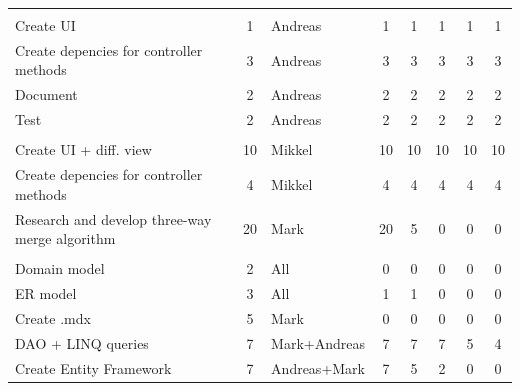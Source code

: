 \documentclass[a4paper,11pt,report]{report}
\begin{document}
\begin{landscape}
\begin{table}[htbp]
\begin{tabular}{l c l c c c c c}
				&       &       &       &       &       &       &  \\
				Create UI & 1     & Andreas & 1     & 1     & 1     & 1     & 1 \\
				Create depencies for controller methods & 3     & Andreas & 3     & 3     & 3     & 3     & 3 \\
				Document & 2     & Andreas & 2     & 2     & 2     & 2     & 2 \\
				Test  & 2     & Andreas & 2     & 2     & 2     & 2     & 2 \\
				&       &       &       &       &       &       &  \\
				Create UI + diff. view & 10    & Mikkel & 10    & 10    & 10    & 10    & 10 \\
				Create depencies for controller methods & 4     & Mikkel & 4     & 4     & 4     & 4     & 4 \\
				Research and develop three-way merge algorithm & 20    & Mark  & 20    & 5     & 0     & 0     & 0 \\
				&       &       &       &       &       &       &  \\
				Domain model & 2     & All   & 0     & 0     & 0     & 0     & 0 \\
				ER model & 3     & All   & 1     & 1     & 0     & 0     & 0 \\
				Create .mdx & 5     & Mark  & 0     & 0     & 0     & 0     & 0 \\
				DAO + LINQ queries & 7     & Mark+Andreas & 7     & 7     & 7     & 5     & 4 \\
				Create Entity Framework & 7     & Andreas+Mark & 7     & 5     & 2     & 0     & 0 \\
				\end{tabular}
				\label{tab:addlabel}
				\end{table}
\end{landscape}
\end{document}
